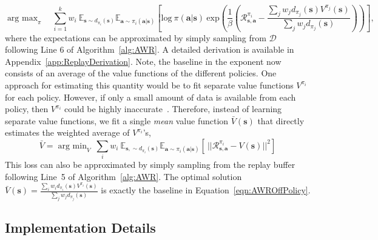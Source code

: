 \documentclass{article} \usepackage{iclr2020_conference,times}
\def\rva{{\mathbf{a}}}
\def\rvs{{\mathbf{s}}}
\newcommand{\weighti}{w_i}
\newcommand{\pii}{\pi_i}
\newcommand{\expec}{\mathbb{E}}
\begin{document}
\begin{equation}
    \mathop{\mathrm{arg \ max}}_{\pi} \quad \sum_{i=1}^k \weighti \ \expec_{\rvs \sim d_{\pii}(\rvs)} \expec_{\rva \sim \pii(\rva | \rvs)} \left[ \mathrm{log} \ \pi (\rva | \rvs) \ \mathrm{exp}\left(\frac{1}{\beta} \left(\mathcal{R}_{\rvs,\rva}^{\pii} - \frac{\sum_j w_j d_{\pi_j}(\rvs) V^{\pi_j}(\rvs)}{\sum_j w_j d_{\pi_j}(\rvs)} \right) \right) \right] ,
\label{eqn:AWROffPolicy}
\end{equation}
where the expectations can be approximated by simply sampling from $\mathcal{D}$ following Line 6 of Algorithm~\ref{alg:AWR}. A detailed derivation is available in Appendix~\ref{app:ReplayDerivation}. Note, the baseline in the exponent now consists of an average of the value functions of the different policies. One approach for estimating this quantity would be to fit separate value functions $V^{\pii}$ for each policy. However, if only a small amount of data is available from each policy, then $V^{\pii}$ could be highly inaccurate~\citep{fu19diagnosing}. Therefore, instead of learning separate value functions, we fit a single \emph{mean} value function $\bar{V}(\rvs)$ that directly estimates the weighted average of $V^{\pii}$'s,
\begin{equation}
\bar{V} = \mathop{\mathrm{arg \ min}}_{V} \  \sum_i \weighti \ \mathbb{E}_{\rvs, \sim d_{\pii}(\rvs)} \expec_{\rva \sim \pii(\rva | \rvs)} \left[ \ ||\mathcal{R}_{\rvs, \rva}^{\pi_i} - V(\rvs) ||^2 \right]
\end{equation}
This loss can also be approximated by simply sampling from the replay buffer following Line~5 of Algorithm~\ref{alg:AWR}. The optimal solution $\bar{V}(\rvs) = \frac{\sum_{i} \weighti d_{\pii}(\rvs) V^{\pii}(\rvs)}{\sum_j w_j d_{\pi_j}(\rvs)}$ is exactly the baseline in Equation~\ref{eqn:AWROffPolicy}.

\subsection{Implementation Details}
\end{document}
